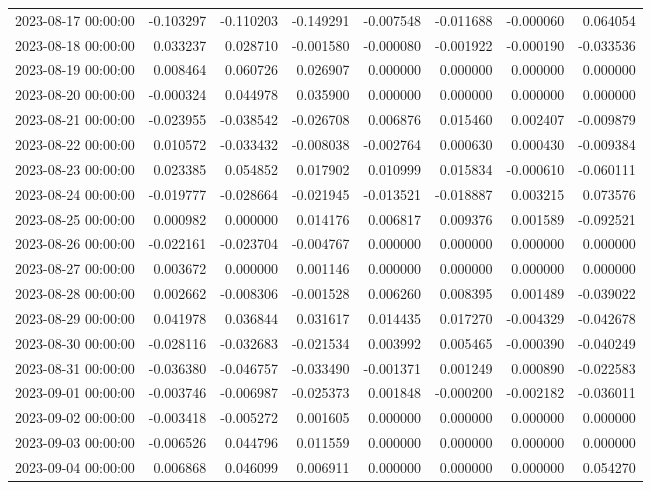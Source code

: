 \begin{tabular}{lrrrrrrr}
2023-08-17 00:00:00 & -0.103297 & -0.110203 & -0.149291 & -0.007548 & -0.011688 & -0.000060 & 0.064054 \\
2023-08-18 00:00:00 & 0.033237 & 0.028710 & -0.001580 & -0.000080 & -0.001922 & -0.000190 & -0.033536 \\
2023-08-19 00:00:00 & 0.008464 & 0.060726 & 0.026907 & 0.000000 & 0.000000 & 0.000000 & 0.000000 \\
2023-08-20 00:00:00 & -0.000324 & 0.044978 & 0.035900 & 0.000000 & 0.000000 & 0.000000 & 0.000000 \\
2023-08-21 00:00:00 & -0.023955 & -0.038542 & -0.026708 & 0.006876 & 0.015460 & 0.002407 & -0.009879 \\
2023-08-22 00:00:00 & 0.010572 & -0.033432 & -0.008038 & -0.002764 & 0.000630 & 0.000430 & -0.009384 \\
2023-08-23 00:00:00 & 0.023385 & 0.054852 & 0.017902 & 0.010999 & 0.015834 & -0.000610 & -0.060111 \\
2023-08-24 00:00:00 & -0.019777 & -0.028664 & -0.021945 & -0.013521 & -0.018887 & 0.003215 & 0.073576 \\
2023-08-25 00:00:00 & 0.000982 & 0.000000 & 0.014176 & 0.006817 & 0.009376 & 0.001589 & -0.092521 \\
2023-08-26 00:00:00 & -0.022161 & -0.023704 & -0.004767 & 0.000000 & 0.000000 & 0.000000 & 0.000000 \\
2023-08-27 00:00:00 & 0.003672 & 0.000000 & 0.001146 & 0.000000 & 0.000000 & 0.000000 & 0.000000 \\
2023-08-28 00:00:00 & 0.002662 & -0.008306 & -0.001528 & 0.006260 & 0.008395 & 0.001489 & -0.039022 \\
2023-08-29 00:00:00 & 0.041978 & 0.036844 & 0.031617 & 0.014435 & 0.017270 & -0.004329 & -0.042678 \\
2023-08-30 00:00:00 & -0.028116 & -0.032683 & -0.021534 & 0.003992 & 0.005465 & -0.000390 & -0.040249 \\
2023-08-31 00:00:00 & -0.036380 & -0.046757 & -0.033490 & -0.001371 & 0.001249 & 0.000890 & -0.022583 \\
2023-09-01 00:00:00 & -0.003746 & -0.006987 & -0.025373 & 0.001848 & -0.000200 & -0.002182 & -0.036011 \\
2023-09-02 00:00:00 & -0.003418 & -0.005272 & 0.001605 & 0.000000 & 0.000000 & 0.000000 & 0.000000 \\
2023-09-03 00:00:00 & -0.006526 & 0.044796 & 0.011559 & 0.000000 & 0.000000 & 0.000000 & 0.000000 \\
2023-09-04 00:00:00 & 0.006868 & 0.046099 & 0.006911 & 0.000000 & 0.000000 & 0.000000 & 0.054270 \\

\end{tabular}
